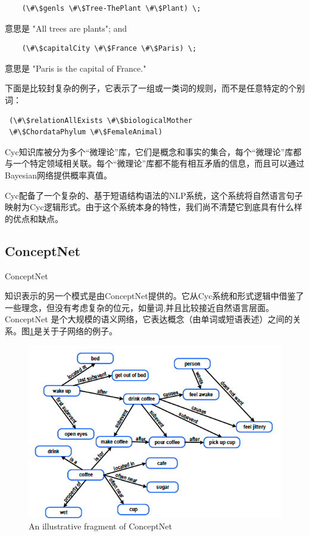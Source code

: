  {\tt\begin{small}\begin{lstlisting}
    (\#\$genls \#\$Tree-ThePlant \#\$Plant) \;
    \end{lstlisting}\end{small}}

\noindent 意思是 "All trees are plants"; and

 {\tt\begin{small}\begin{lstlisting}
    (\#\$capitalCity \#\$France \#\$Paris) \;
    \end{lstlisting}\end{small}}

\noindent 意思是 "Paris is the capital of France."


下面是比较封复杂的例子，它表示了一组或一类词的规则，而不是任意特定的个别词：

 {\tt\begin{small}\begin{lstlisting}
 (\#\$relationAllExists \#\$biologicalMother
 \#\$ChordataPhylum \#\$FemaleAnimal)
    \end{lstlisting}\end{small}}


Cyc知识库被分为多个“微理论”库，它们是概念和事实的集合，每个“微理论”库都与一个特定领域相关联。每个“微理论”库都不能有相互矛盾的信息，而且可以通过Bayesian网络提供概率真值。

Cyc配备了一个复杂的、基于短语结构语法的NLP系统，这个系统将自然语言句子映射为Cyc逻辑形式。由于这个系统本身的特性，我们尚不清楚它到底具有什么样的优点和缺点。


\subsection{ConceptNet}{ConceptNet}

知识表示的另一个模式是由ConceptNet提供的\cite{Liu2004}。它从Cyc系统和形式逻辑中借鉴了一些理念，但没有考虑复杂的位元，如量词,并且比较接近自然语言层面。ConceptNet 是个大规模的语义网络，它表达概念（由单词或短语表述）之间的关系。图\ref{fig:concept}是关于子网络的例子。

\begin{figure}[htb]
\centering
\includegraphics[width=12cm]{figures/conceptnet.png}
\caption{ An illustrative fragment of ConceptNet }
\label{fig:concept}
\end{figure}

